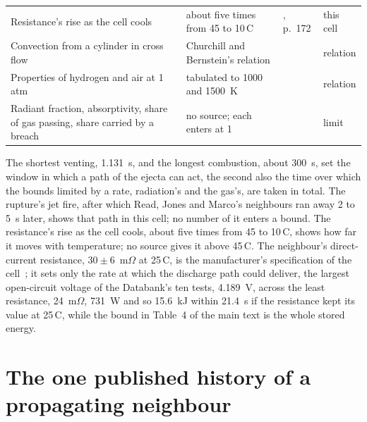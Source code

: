 \documentclass[preprint,12pt]{elsarticle}
\newcommand{\degC}{\,\textdegree C}
\begin{document}
\begin{table}[!htbp]
\begin{tabular}{p{}p{}p{}p{}}
Resistance's rise as the cell cools & about five times from 45 to 10\degC & \cite{popp2020antemortem}, p.~172 & this cell \\
Convection from a cylinder in cross flow & Churchill and Bernstein's relation & \cite{churchill1977correlating,lienhard2024heat} & relation \\
Properties of hydrogen and air at 1 atm & tabulated to 1000 and 1500~K & \cite[Table A.6]{lienhard2024heat} & relation \\
Radiant fraction, absorptivity, share of gas passing, share carried by a breach & no source; each enters at 1 & & limit \\
\bottomrule
\end{tabular}
\end{table}

The shortest venting, 1.131~s, and the longest combustion, about 300~s, set the window in which a path of the ejecta can act, the second also the time over which the bounds limited by a rate, radiation's and the gas's, are taken in total. The rupture's jet fire, after which Read, Jones and Marco's neighbours ran away 2 to 5~s later, shows that path in this cell; no number of it enters a bound. The resistance's rise as the cell cools, about five times from 45 to 10\degC, shows how far it moves with temperature; no source gives it above 45\degC. The neighbour's direct-current resistance, $30\pm6$~m$\Omega$ at 25\degC, is the manufacturer's specification of the cell~\cite{lg2017m50}; it sets only the rate at which the discharge path could deliver, the largest open-circuit voltage of the Databank's ten tests, 4.189~V, across the least resistance, 24~m$\Omega$, 731~W and so 15.6~kJ within 21.4~s if the resistance kept its value at 25\degC, while the bound in Table~4 of the main text is the whole stored energy.

\section{The one published history of a propagating neighbour}
\label{sec:s-history}
\end{document}

